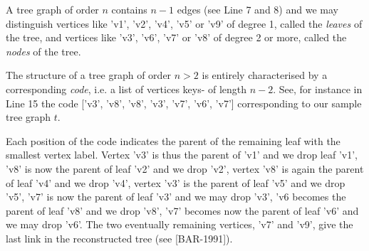A tree graph of order $n$ contains $n-1$ edges (see Line 7 and 8) and we may distinguish vertices like 'v1', 'v2', 'v4', 'v5' or 'v9'  of degree 1, called the \emph{leaves} of the tree, and vertices like 'v3', 'v6', 'v7' or 'v8' of degree 2 or more, called the \emph{nodes} of the tree.

The structure of a tree graph of order $n > 2$ is entirely characterised by a corresponding \Pruefer \emph{code}, i.e. a list of vertices keys- of length $n-2$. See, for instance in Line 15 the code ['v3', 'v8', 'v8', 'v3', 'v7', 'v6', 'v7'] corresponding to our sample tree graph $t$.

Each position of the code indicates the parent of the remaining leaf with the smallest vertex label. Vertex 'v3' is thus the parent of 'v1' and we drop leaf 'v1', 'v8' is now the parent of leaf 'v2' and we drop 'v2', vertex 'v8' is again the parent of leaf 'v4' and we drop 'v4', vertex 'v3' is the parent of leaf 'v5' and we drop 'v5', 'v7' is now the parent of leaf 'v3' and we may drop 'v3', 'v6 becomes the parent of leaf 'v8' and we drop 'v8', 'v7' becomes now the parent of leaf 'v6' and we may drop 'v6'. The two eventually remaining vertices, 'v7' and 'v9', give the last link in the reconstructed tree (see [BAR-1991]).  

